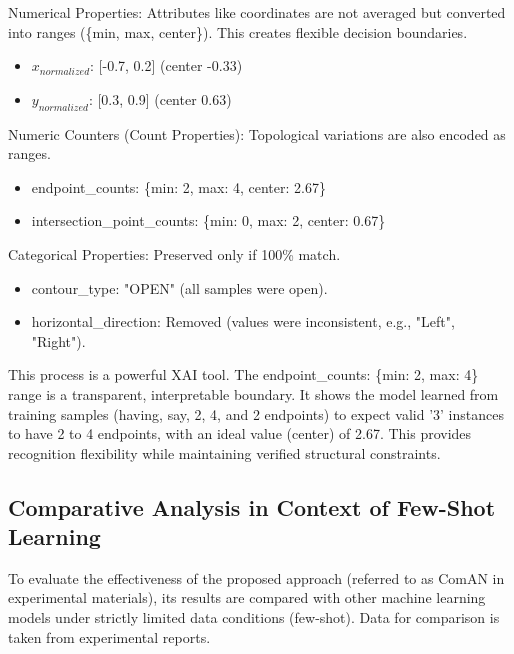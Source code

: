 \documentclass[conference]{IEEEtran}
\begin{document}
Numerical Properties: Attributes like coordinates are not averaged but converted into ranges (\{min, max, center\}). This creates flexible decision boundaries.
\begin{itemize}
    \item $x_{normalized}$: [-0.7, 0.2] (center -0.33)
    \item $y_{normalized}$: [0.3, 0.9] (center 0.63)
\end{itemize}

Numeric Counters (Count Properties): Topological variations are also encoded as ranges.
\begin{itemize}
    \item endpoint\_counts: \{min: 2, max: 4, center: 2.67\}
    \item intersection\_point\_counts: \{min: 0, max: 2, center: 0.67\}
\end{itemize}

Categorical Properties: Preserved only if 100\% match.
\begin{itemize}
    \item contour\_type: "OPEN" (all samples were open).
    \item horizontal\_direction: Removed (values were inconsistent, e.g., "Left", "Right").
\end{itemize}
This process is a powerful XAI tool. The endpoint\_counts: \{min: 2, max: 4\} range is a transparent, interpretable boundary. It shows the model learned from training samples (having, say, 2, 4, and 2 endpoints) to expect valid '3' instances to have 2 to 4 endpoints, with an ideal value (center) of 2.67. This provides recognition flexibility while maintaining verified structural constraints.

\subsection{Comparative Analysis in Context of Few-Shot Learning}
To evaluate the effectiveness of the proposed approach (referred to as ComAN in experimental materials), its results are compared with other machine learning models under strictly limited data conditions (few-shot). Data for comparison is taken from experimental reports.
\end{document}
